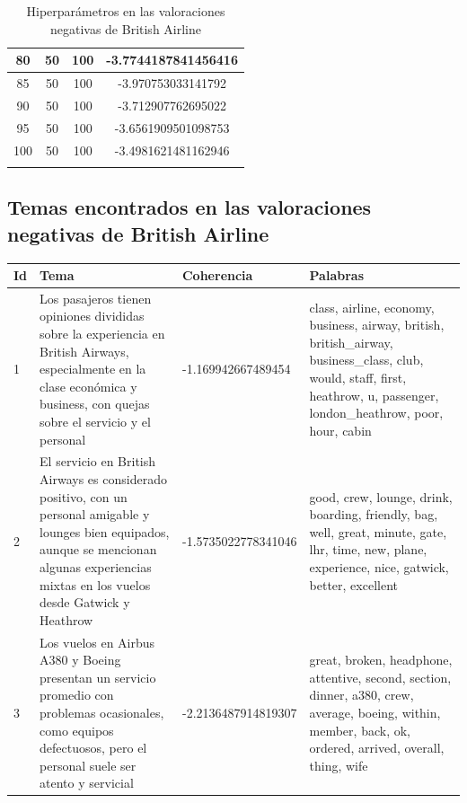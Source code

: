 \documentclass{report}
\begin{document}
{\begin{longtable}{|c|c|c|c|}
                    \hline
                    80 & 50 & 100 & -3.7744187841456416 \\
                    \hline
                    85 & 50 & 100 & -3.970753033141792 \\
                    \hline
                    90 & 50 & 100 & -3.712907762695022 \\
                    \hline
                    95 & 50 & 100 & -3.6561909501098753 \\
                    \hline
                    100 & 50 & 100 & -3.4981621481162946 \\
                    \hline
                    \caption{Hiperparámetros en las valoraciones negativas de British Airline}
                \end{longtable}
            \clearpage\subsection{Temas encontrados en las valoraciones negativas de British Airline}
                \label{tab:temas_british_airline_negativas}
                \begin{longtable}{|p{1cm}|p{4cm}|p{4cm}|p{6cm}|}
                    \hline
                    \textbf{Id} & \textbf{Tema} & \textbf{Coherencia} & \textbf{Palabras} \\
                    \hline
                    1 & Los pasajeros tienen opiniones divididas sobre la experiencia en British Airways, especialmente en la clase económica y business, con quejas sobre el servicio y el personal & -1.169942667489454 & class, airline, economy, business, airway, british, british\_airway, business\_class, club, would, staff, first, heathrow, u, passenger, london\_heathrow, poor, hour, cabin \\
                    \hline
                    2 & El servicio en British Airways es considerado positivo, con un personal amigable y lounges bien equipados, aunque se mencionan algunas experiencias mixtas en los vuelos desde Gatwick y Heathrow & -1.5735022778341046 & good, crew, lounge, drink, boarding, friendly, bag, well, great, minute, gate, lhr, time, new, plane, experience, nice, gatwick, better, excellent \\
                    \hline
                    3 & Los vuelos en Airbus A380 y Boeing presentan un servicio promedio con problemas ocasionales, como equipos defectuosos, pero el personal suele ser atento y servicial & -2.2136487914819307 & great, broken, headphone, attentive, second, section, dinner, a380, crew, average, boeing, within, member, back, ok, ordered, arrived, overall, thing, wife \\

\end{longtable}}
\end{document}
